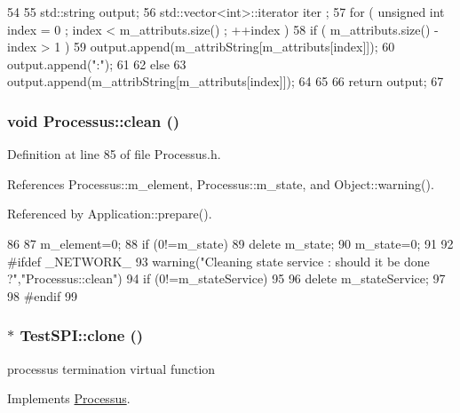 \begin{DoxyCode}
54                             {
55   std::string output;
56   std::vector<int>::iterator iter ;
57   for ( unsigned int index = 0 ; index < m_attributs.size() ; ++index ) {
58     if ( m_attributs.size() - index > 1 ) {
59       output.append(m_attribString[m_attributs[index]]);
60       output.append(":");
61     }
62     else {
63       output.append(m_attribString[m_attributs[index]]);
64     }
65   }
66   return output;
67 }
\end{DoxyCode}
\hypertarget{classProcessus_aaeb17673b98d2b39f3aa780e335e0968}{
\subsubsection[{clean}]{\setlength{\rightskip}{0pt plus 5cm}void Processus::clean ()}}
\label{classProcessus_aaeb17673b98d2b39f3aa780e335e0968}


Definition at line 85 of file Processus.h.

References Processus::m\_\-element, Processus::m\_\-state, and Object::warning().

Referenced by Application::prepare().


\begin{DoxyCode}
86   {
87     m_element=0;
88     if (0!=m_state) {
89       delete m_state;
90       m_state=0;
91     }
92 #ifdef _NETWORK_
93     warning("Cleaning state service : should it be done ?","Processus::clean")
94       if (0!=m_stateService)
95       {
96         delete m_stateService;
97       }
98 #endif
99   }
\end{DoxyCode}
\hypertarget{classTestSPI_afbca7dd9802d226ee1fec8475ff5f127}{
\subsubsection[{clone}]{$\ast$ TestSPI::clone ()}}
\label{classTestSPI_afbca7dd9802d226ee1fec8475ff5f127}
processus termination virtual function 

Implements \hyperlink{classProcessus_aca8856f6d6d7b7e1fe941f298dcbb502}{Processus}.

